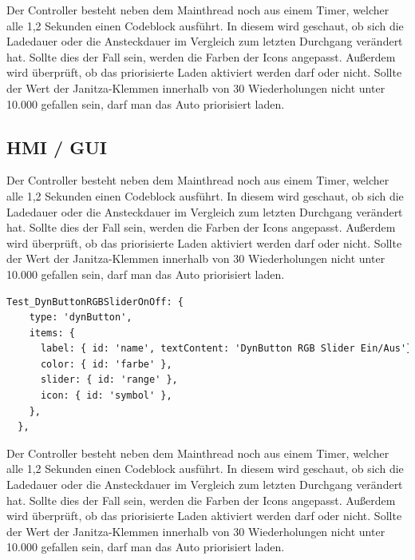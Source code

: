 Der Controller besteht neben dem Mainthread noch aus einem Timer, welcher alle 1,2 Sekunden einen Codeblock ausführt. In diesem wird geschaut, ob sich die Ladedauer oder die Ansteckdauer im Vergleich zum letzten Durchgang verändert hat. Sollte dies der Fall sein, werden die Farben der Icons angepasst. Außerdem wird überprüft, ob das priorisierte Laden aktiviert werden darf oder nicht. Sollte der Wert der Janitza-Klemmen innerhalb von 30 Wiederholungen nicht unter 10.000 gefallen sein, darf man das Auto priorisiert laden.

\subsection{HMI / GUI} 
Der Controller besteht neben dem Mainthread noch aus einem Timer, welcher alle 1,2 Sekunden einen Codeblock ausführt. In diesem wird geschaut, ob sich die Ladedauer oder die Ansteckdauer im Vergleich zum letzten Durchgang verändert hat. Sollte dies der Fall sein, werden die Farben der Icons angepasst. Außerdem wird überprüft, ob das priorisierte Laden aktiviert werden darf oder nicht. Sollte der Wert der Janitza-Klemmen innerhalb von 30 Wiederholungen nicht unter 10.000 gefallen sein, darf man das Auto priorisiert laden.

\begin{lstlisting}[language=HTML,caption=Example Element,label=lst:impl:foo]
  Test_DynButtonRGBSliderOnOff: { 
    type: 'dynButton', 
    items: { 
      label: { id: 'name', textContent: 'DynButton RGB Slider Ein/Aus'}, 
      color: { id: 'farbe' }, 
      slider: { id: 'range' }, 
      icon: { id: 'symbol' }, 
    }, 
  }, 
\end{lstlisting}
Der Controller besteht neben dem Mainthread noch aus einem Timer, welcher alle 1,2 Sekunden einen Codeblock ausführt. In diesem wird geschaut, ob sich die Ladedauer oder die Ansteckdauer im Vergleich zum letzten Durchgang verändert hat. Sollte dies der Fall sein, werden die Farben der Icons angepasst. Außerdem wird überprüft, ob das priorisierte Laden aktiviert werden darf oder nicht. Sollte der Wert der Janitza-Klemmen innerhalb von 30 Wiederholungen nicht unter 10.000 gefallen sein, darf man das Auto priorisiert laden.

